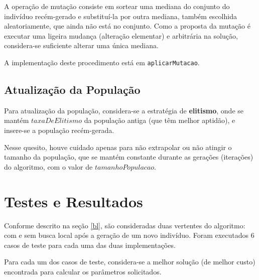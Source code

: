 	A operação de mutação consiste em sortear uma mediana do conjunto do indivíduo recém-gerado e substituí-la por outra mediana, também escolhida aleatoriamente, que ainda não está no conjunto. Como a proposta da mutação é executar uma ligeira mudança (alteração elementar) e arbitrária na solução, considera-se suficiente alterar uma única mediana.

	A implementação deste procedimento está em \verb|aplicarMutacao|.

	\subsection{Atualização da População}
	Para atualização da população, considera-se a estratégia de \textbf{elitismo}, onde se mantém $taxaDeElitismo$ da população antiga (que têm melhor aptidão), e insere-se a população recém-gerada.

	Nesse quesito, houve cuidado apenas para não extrapolar ou não atingir o tamanho da população, que se mantém constante durante as gerações (iterações) do algoritmo, com o valor de $tamanhoPopulacao$.

	\section{Testes e Resultados}
	Conforme descrito na seção \ref{bl}, são consideradas duas vertentes do algoritmo: com e sem busca local após a geração de um novo indivíduo. Foram executados $6$ casos de teste para cada uma das duas implementações.

	Para cada um dos casos de teste, considera-se a melhor solução (de melhor custo) encontrada para calcular os parâmetros solicitados.

